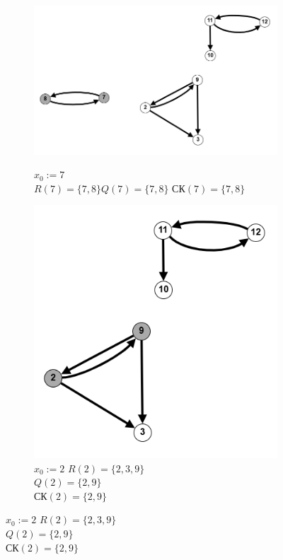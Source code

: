 \documentclass{article}
\begin{document}
\begin{enumerate}
\begin{figure}[ht]
     \hfill
     \begin{subfigure}[t]{0.4\textwidth}
         \centering
         \caption*{\small{$x_0 := 7$\\
            $R(7)=\{7,8\}$\qquad$Q(7)=\{7,8\}$\qquad
            $\text{СК}(7) = \{7,8\}$}}
         \includegraphics[width=\textwidth]{attachments/1/sk-3.png}
         \label{fig:1_2}
        \end{subfigure}
          \hfill
     \begin{subfigure}[t]{0.22\textwidth}
         \centering
         \caption*{\small{$x_0 := 2$\quad
        $R(2)=\{2,3,9\}$\\$Q(2)=\{2,9\}$\\
        $\text{СК}(2) = \{2,9\}$}}
         \includegraphics[width=\textwidth]{attachments/1/sk-4.png}

\end{subfigure}
\end{figure}
\end{enumerate}
\end{document}
